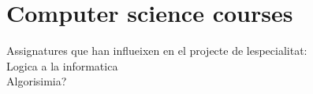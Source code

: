 
\chapter{Computer science courses} %

\label{Chapter3} %

Assignatures que han influeixen en el projecte de lespecialitat:\\
Logica a la informatica\\
Algorisimia?
